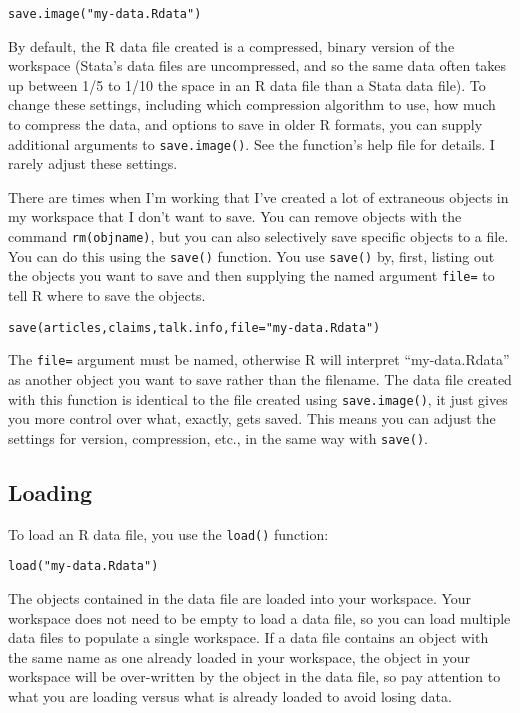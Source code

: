 \documentclass[12pt, oneside]{amsart}   	%
\begin{document}
\begin{verbatim}
save.image("my-data.Rdata")
\end{verbatim}

By default, the R data file created is a compressed, binary version of the workspace (Stata's data files are uncompressed, and so the same data often takes up between 1/5 to 1/10 the space in an R data file than a Stata data file). To change these settings, including which compression algorithm to use, how much to compress the data, and options to save in older R formats, you can supply additional arguments to \texttt{save.image()}. See the function's help file for details. I rarely adjust these settings.

There are times when I'm working that I've created a lot of extraneous objects in my workspace that I don't want to save. You can remove objects with the command \texttt{rm(objname)}, but you can also selectively save specific objects to a file. You can do this using the \texttt{save()} function. You use \texttt{save()} by, first, listing out the objects you want to save and then supplying the named argument \texttt{file=} to tell R where to save the objects.

\begin{verbatim}
save(articles,claims,talk.info,file="my-data.Rdata")
\end{verbatim}

The \texttt{file=} argument must be named, otherwise R will interpret ``my-data.Rdata'' as another object you want to save rather than the filename. The data file created with this function is identical to the file created using \texttt{save.image()}, it just gives you more control over what, exactly, gets saved. This means you can adjust the settings for version, compression, etc., in the same way with \texttt{save()}.

\subsection{Loading}

To load an R data file, you use the \texttt{load()} function:

\begin{verbatim}
load("my-data.Rdata")
\end{verbatim}

The objects contained in the data file are loaded into your workspace. Your workspace does not need to be empty to load a data file, so you can load multiple data files to populate a single workspace. If a data file contains an object with the same name as one already loaded in your workspace, the object in your workspace will be over-written by the object in the data file, so pay attention to what you are loading versus what is already loaded to avoid losing data.
\end{document}
